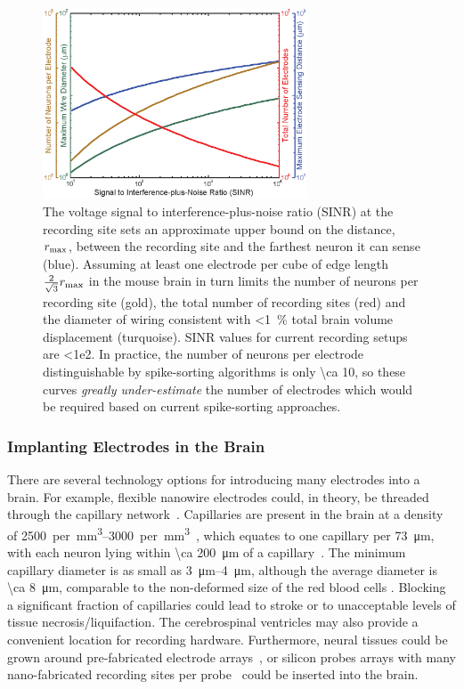 \begin{figure}[htbp]
\caption{
The voltage signal to interference-plus-noise ratio (SINR) at the recording site sets an approximate upper bound on the distance, $r_{\text{\scriptsize max}}$, between the recording site and the farthest neuron it can sense (blue).
Assuming at least one electrode per cube of edge length $\frac{2}{\sqrt{3}}r_{\text{\scriptsize max}}$ in the mouse brain in turn limits the number of neurons per recording site (gold), the total number of recording sites (red) and the diameter of wiring consistent with \SI{<1}{\percent} total brain volume displacement (turquoise).
SINR values for current recording setups are \num{<1e2}.
In practice, the number of neurons per electrode distinguishable by spike-sorting algorithms is only \num{\ca 10}, so these curves \emph{greatly under-estimate} the number of electrodes which would be required based on current spike-sorting approaches.
}
\label{fig:snrlimits}
\centering
\includegraphics[width=0.7\textwidth]{figs/Fig3.eps}
\end{figure}

\subsubsection{Implanting Electrodes in the Brain}

There are several technology options for introducing many electrodes into a brain.
For example, flexible nanowire electrodes could, in theory, be threaded through the capillary network~\cite{llinas05}.
Capillaries are present in the brain at a density of \SIrange{2500}{3000}{per \milli\meter\cubed}~\cite{schmidt89}, which equates to one capillary per \SI{73}{\micro\meter}, with each neuron lying within \SI{\ca 200}{\micro\meter} of a capillary~\cite{loffredo08}. The minimum capillary diameter is as small as \SIrange{3}{4}{\micro\meter}, although the average diameter is \SI{\ca 8}{\micro\meter}, comparable to the non-deformed size of the red blood cells \cite{Freitas1999}. Blocking a significant fraction of capillaries could lead to stroke or to unacceptable levels of tissue necrosis/liquifaction.
The cerebrospinal ventricles may also provide a convenient location for recording hardware. Furthermore, neural tissues could be grown around pre-fabricated electrode arrays~\cite{jadhav12}, or silicon probes arrays with many nano-fabricated recording sites per probe~\cite{du11} could be inserted into the brain.

